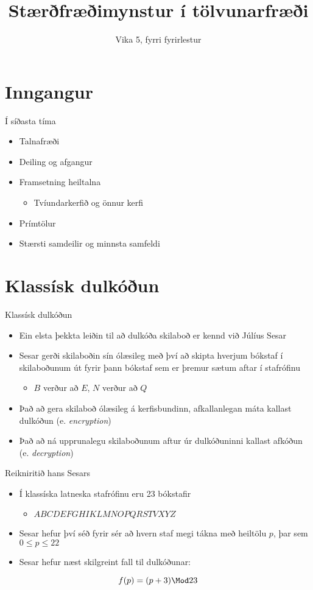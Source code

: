 \documentclass{beamer}
\title{Stærðfræðimynstur í tölvunarfræði}
\subtitle{Vika 5, fyrri fyrirlestur}
\begin{document}
\begin{frame}
\titlepage
\end{frame}


\section{Inngangur}

\begin{frame}{Í síðasta tíma}
\begin{itemize}
 \item Talnafræði
 \item Deiling og afgangur
 \item Framsetning heiltalna
 \begin{itemize}
  \item Tvíundarkerfið og önnur kerfi
 \end{itemize}
 \item Prímtölur
 \item Stærsti samdeilir og minnsta samfeldi
\end{itemize}
\end{frame}

\section{Klassísk dulkóðun}

\begin{frame}{Klassísk dulkóðun}
\begin{itemize}
 \item Ein elsta þekkta leiðin til að dulkóða skilaboð er kennd við Júlíus Sesar
 \item Sesar gerði skilaboðin sín ólæsileg með því að skipta hverjum bókstaf í skilaboðunum út fyrir þann bókstaf sem er þremur sætum aftar í stafrófinu
 \begin{itemize}
  \item $B$ verður að $E$, $N$ verður að $Q$
 \end{itemize}
 \item Það að gera skilaboð ólæsileg á kerfisbundinn, afkallanlegan máta kallast dulkóðun (e. \emph{encryption})
 \item Það að ná upprunalegu skilaboðunum aftur úr dulkóðuninni kallast afkóðun (e. \emph{decryption})
\end{itemize}
\end{frame}

\begin{frame}{Reikniritið hans Sesars}
\begin{itemize}
 \item Í klassíska latneska stafrófinu eru 23 bókstafir
 \begin{itemize}
  \item $A	B	C	D	E	F	G	H	 I	K	L	M	N	O	P	Q	R	S	T	V	X	Y	Z$
 \end{itemize}
 \item Sesar hefur því séð fyrir sér að hvern staf megi tákna með heiltölu $p$, þar sem $0 \leq p \leq 22$
 \item Sesar hefur næst skilgreint fall til dulkóðunar:
\end{itemize}
\[
 f(p) = (p + 3) \Mod 23
\]
\end{frame}
\end{document}
